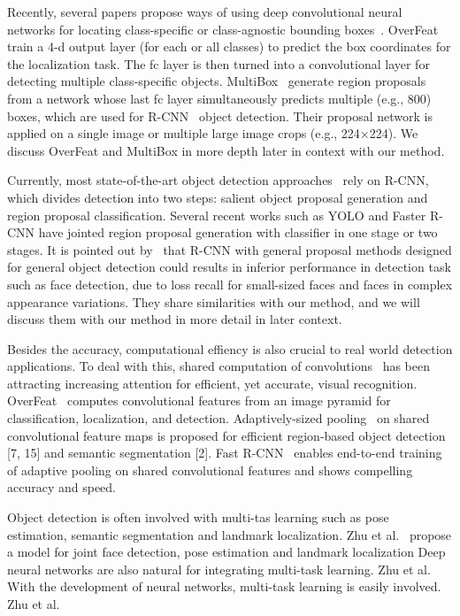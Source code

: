 Recently, several papers propose ways of using deep convolutional neural networks for locating class-specific or class-agnostic bounding boxes~\cite{sermanet2013overfeat, erhan2014scalable, YOLO}. OverFeat~\cite{sermanet2013overfeat} train a 4-d output layer (for each or all classes) to predict the box coordinates for the localization task. The fc layer is then turned into a convolutional layer for detecting multiple class-specific objects. MultiBox~\cite{erhan2014scalable} generate region proposals from a network whose last fc layer simultaneously predicts multiple (e.g., 800) boxes, which are used for R-CNN~\cite{girshick2014rich} object detection. Their proposal network is applied on a single image or multiple large image crops (e.g., 224×224). We discuss OverFeat and MultiBox in more depth later in context with our method.

Currently, most state-of-the-art object detection approaches~\cite{ouyang2014deepid, li2015convolutional, erhan2014scalable,girshick2015fast} rely on R-CNN, which divides detection into two steps: salient object proposal generation and region proposal classification. Several recent works such as YOLO and Faster R-CNN have jointed region proposal generation with classifier in one stage or two stages. It is pointed out by~\cite{farfade2015multi} that R-CNN with general proposal methods designed for general object detection could results in inferior performance in detection task such as face detection, due to loss recall for small-sized faces and faces in complex appearance variations. They share similarities with our method, and we will discuss them with our method in more detail in later context.  

Besides the accuracy, computational effiency is also crucial to real world detection applications. To deal with this, shared computation of convolutions~\cite{sermanet2013overfeat, he2014spatial, ren2015faster, long2015fully} has been attracting increasing attention for efficient, yet accurate, visual recognition. OverFeat~\cite{sermanet2013overfeat} computes convolutional features from an image pyramid for classification, localization, and detection. Adaptively-sized pooling~\cite{he2014spatial} on shared convolutional feature maps is proposed for efficient region-based object detection [7, 15] and semantic segmentation [2]. Fast R-CNN~\cite{ren2015faster} enables end-to-end training of adaptive pooling on shared convolutional features and shows compelling accuracy and speed.

Object detection is often involved with multi-tas learning such as pose estimation, semantic segmentation and landmark localization. Zhu et al.~\cite{2012face} propose a model for joint face detection, pose estimation and landmark localization 
Deep neural networks are also natural for integrating multi-task learning. Zhu et al.~\cite{2012face}
With the development of neural networks, multi-task learning is easily involved. Zhu et al.~\cite{zhu2012face} 
